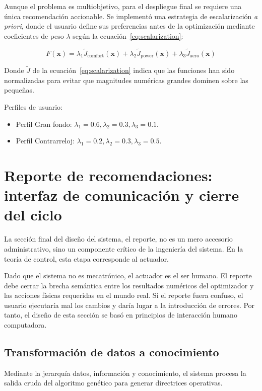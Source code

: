 Aunque el problema es multiobjetivo, para el despliegue final se requiere una
única recomendación accionable. Se implementó una estrategia de escalarización
\textit{a priori}, donde el usuario define sus preferencias antes de la
optimización mediante coeficientes de peso $\lambda$ según la ecuación~\ref{eq:scalarization}:

\begin{equation}
  \label{eq:scalarization}
  F(\mathbf{x}) = \lambda_1 \tilde{J}_{\text{comfort}}(\mathbf{x}) + \lambda_2 \tilde{J}_{\text{power}}(\mathbf{x}) + \lambda_3 \tilde{J}_{\text{aero}}(\mathbf{x})
\end{equation}

Donde $\tilde{J}$ de la ecuación~\ref{eq:scalarization} indica que las funciones han sido normalizadas para evitar
que magnitudes numéricas grandes dominen sobre las pequeñas.

Perfiles de usuario:
\begin{itemize}
  \item Perfil Gran fondo: $\lambda_1=0.6, \lambda_2=0.3, \lambda_3=0.1$.
  \item Perfil Contrarreloj: $\lambda_1=0.2, \lambda_2=0.3, \lambda_3=0.5$.
\end{itemize}

\section{Reporte de recomendaciones: interfaz de comunicación y cierre del ciclo}

La sección final del diseño del sistema, el reporte, no es un mero accesorio
administrativo, sino un componente crítico de la ingeniería del sistema. En la
teoría de control, esta etapa corresponde al actuador.

Dado que el sistema no es mecatrónico, el actuador es el ser humano. El reporte
debe cerrar la brecha semántica entre los resultados numéricos del
optimizador y las acciones físicas requeridas en el mundo real. Si el reporte
fuera confuso, el usuario ejecutaría mal los cambios y daría lugar a la introducción de errores.
 Por tanto, el diseño de esta sección se basó en principios de
interacción humano computadora.

\subsection{Transformación de datos a conocimiento}

Mediante la jerarquía datos, información y conocimiento, el sistema procesa la salida cruda del algoritmo
genético para generar directrices operativas.

